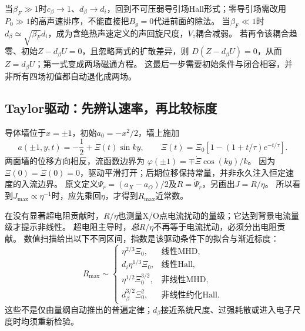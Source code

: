 \documentclass[UTF8,a4paper,11pt,openany,fontset=fandol]{ctexbook}
\begin{document}
当$\beta_F\gg1$时$c_\beta\to1$、$d_\beta\to d_i$，回到不可压弱导引场Hall形式；零导引场需改用$P_0\gg1$的高声速排序，不能直接把$B_g=0$代进前面的除法。
当$\beta_F\ll1$时$d_\beta\simeq\sqrt{\beta_F}d_i$，成为含绝热声速定义的声回旋尺度，$V_z$耦合减弱。
若再令该耦合趋零、初始$Z-d_\beta U=0$，且忽略两式的扩散差异，则
$D(Z-d_\beta U)=0$，从而$Z=d_\beta U$；第一式变成两场磁通方程。
这最后一步需要初始条件与闭合相容，并非所有四场初值都自动退化成两场。


\subsection{Taylor驱动：先辨认速率，再比较标度}
导体墙位于$x=\pm1$，初始$a_0=-x^2/2$，墙上施加
\begin{equation}
 a(\pm1,y,t)=-\frac12+\Xi(t)\sin ky,\qquad
 \Xi(t)=\Xi_0[1-(1+t/\tau)e^{-t/\tau}].
\end{equation}
两面墙的位移方向相反，流函数边界为
$\varphi(\pm1)=\mp\dot\Xi\cos(ky)/k$。
因为$\Xi(0)=\dot\Xi(0)=0$，驱动平滑打开；后期位移保持常量，并非永久注入恒定速度的入流边界。
原文定义$\Psi_r=(a_X-a_O)/2$及$R=\dot\Psi_r$，另画出$J=R/\eta$。
所以看到$J_{\max}\propto\eta^{-1}$时，应先乘回$\eta$，才得到$R_{\max}$近常数。

在没有显著超电阻贡献时，$R/\eta$也测量X/O点电流扰动的量级；它达到背景电流量级才提示非线性。
超电阻主导时，\emph{总}$R/\eta$不再等于电流扰动，必须分出电阻贡献。
数值扫描给出以下不同区间，指数是该驱动条件下的拟合与渐近标度：
\begin{equation}
 R_{\max}\sim
 \begin{cases}
 \eta^{2/3}\Xi_0,&\text{线性MHD},\\
 d_i\eta^{1/3}\Xi_0,&\text{线性Hall},\\
 \eta^{1/2}\Xi_0^{3/2},&\text{非线性MHD},\\
 d_\beta^{3/2}\Xi_0^2,&\text{非线性约化Hall}.
 \end{cases}
\end{equation}
这些不是仅由量纲自动推出的普遍定律；$d_\beta$接近系统尺度、过强耗散或进入电子尺度时均须重新检验。
\end{document}
